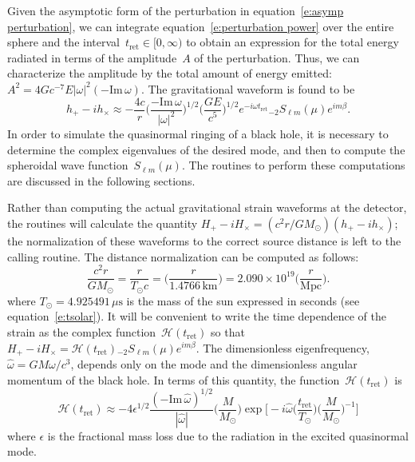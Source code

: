 Given the asymptotic form of the perturbation in
equation~\ref{e:asymp perturbation}, we can integrate
equation~\ref{e:perturbation power} over the entire sphere and the
interval~$t_{\mathrm{\scriptstyle ret}}\in[0,\infty)$ to obtain an expression
for the total energy
radiated in terms of the amplitude~$A$ of the perturbation.  Thus, we can
characterize the amplitude by the total amount of energy emitted:
$A^2=4Gc^{-7}E|\omega|^2(-{\mathrm{Im}}\,\omega)$.  The gravitational waveform
is found to be
\begin{equation}
  h_+ - ih_\times \approx - \frac{4c}{r}
    \biggl(\frac{-{\mathrm{Im}}\,\omega}{|\omega|^2}\biggr)^{1/2}
    \biggl(\frac{GE}{c^5}\biggr)^{1/2}
    e^{-i\omega t_{\mathrm{\scriptscriptstyle ret}}}
    {}_{-2}S_{\ell m}(\mu) e^{im\beta}.
  \label{e:quasinormal ring strain}
\end{equation}
In order to simulate the quasinormal ringing of a black hole, it is necessary
to determine the complex eigenvalues of the desired mode,
and then to compute the spheroidal wave function~$S_{\ell m}(\mu)$.  The
routines to perform these computations are discussed in the following sections.

Rather than computing the actual gravitational strain waveforms at the
detector, the routines will calculate the quantity
$H_+-iH_\times=(c^2r/GM_\odot)(h_+-ih_\times)$; the normalization
of these waveforms to the correct source distance is left to the calling
routine.  The distance normalization can be computed as follows:
\begin{equation}
  \frac{c^2r}{GM_\odot} = \frac{r}{T_\odot c}
    = \biggl( \frac{r}{1.4766\,{\mathrm{km}}} \biggr)
    = 2.090\times10^{19}\biggl( \frac{r}{\mathrm{Mpc}} \biggr).
  \label{e:radius in solar masses}
\end{equation}
where $T_\odot=4.925491\,\mu{\mathrm{s}}$ is the mass of the sun expressed in
seconds (see equation~\ref{e:tsolar}).
It will be convenient to write the time dependence of the strain as the
complex function~${\mathcal{H}}(t_{\mathrm{\scriptstyle ret}})$ so that
$H_+-iH_\times={\mathcal{H}}(t_{\mathrm{\scriptstyle ret}})
 {}_{-2}S_{\ell m}(\mu)e^{im\beta}$.
The dimensionless eigenfrequency, $\hat{\omega}=GM\omega/c^3$,
depends only on the mode and the dimensionless
angular momentum of the black hole.  In terms of this quantity,
the function~${\mathcal{H}}(t_{\mathrm{\scriptstyle ret}})$ is
\begin{equation}
  {\mathcal{H}}(t_{\mathrm{\scriptstyle ret}}) \approx -4 \epsilon^{1/2}
    \frac{(-{\mathrm{Im}}\,\hat{\omega})^{1/2}}{|\hat{\omega}|}
    \biggl(\frac{M}{M_\odot}\biggr)
    \exp\biggl[-i\hat{\omega}\biggl(
      \frac{t_{\mathrm{\scriptstyle ret}}}{T_\odot}\biggr)
      \biggl(\frac{M}{M_\odot}\biggr)^{-1}\biggr]
  \label{e:dimensionless strain function}
\end{equation}
where $\epsilon$ is the fractional mass loss due to the radiation in the
excited quasinormal mode.


